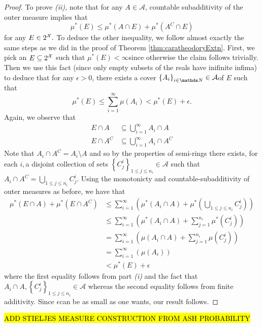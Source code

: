 \begin{proof}
To prove \emph{(ii), }note that for any $A\in\mathcal{A}$, countable
subadditivity of the outer measure implies that 
\[
\mu^{*}\left(E\right)\leq\mu^{*}\left(A\cap E\right)+\mu^{*}\left(A^{C}\cap E\right)
\]
for any $E\in2^{\mathcal{X}}.$ To deduce the other inequality, we follow almost
exactly the same steps as we did in the proof of Theorem \ref{thm:caratheodoryExtn}.
First, we pick an $E\subseteq2^{\mathcal{X}}$ such that $\mu^{*}\left(E\right)<\infty$since
otherwise the claim follows trivially. Then we use this fact (since
only empty subsets of the reals have inifinite infima) to deduce that
for any $\epsilon>0$, there exists a cover $\left\{ A_{i}\right\} _{i\in\N}\in\mathcal{A}$of
$E$ such that
\[
\mu^{*}\left(E\right)\leq\sum_{i=1}^{\infty}\mu\left(A_{i}\right)<\mu^{*}\left(E\right)+\epsilon.
\]
Again, we observe that 
\begin{align*}
E\cap A & \subseteq\bigcup_{i=1}^{\infty}A_{i}\cap A\\
E\cap A^{C} & \subseteq\bigcup_{i=1}^{\infty}A_{i}\cap A^{C}
\end{align*}
Note that $A_{i}\cap A^{C}=A_{i}\setminus A$ and so by the properties
of semi-rings there exists, for each $i,$a disjoint collection of
sets $\left\{ C_{j}^{i}\right\} _{1\leq j\leq n_{i}}\in\mathcal{A}$
such that $A_{i}\cap A^{C}=\bigcup_{1\leq j\leq n_{i}}C_{j}^{i}.$
Using the monotonicty and countable-subadditivity of outer measures
as before, we have that
\begin{align*}
\mu^{*}\left(E\cap A\right)+\mu^{*}\left(E\cap A^{C}\right) & \leq\sum_{i=1}^{\infty}\left(\mu^{*}\left(A_{i}\cap A\right)+\mu^{*}\left(\bigcup_{1\leq j\leq n_{i}}C_{j}^{i}\right)\right)\\
 & \leq\sum_{i=1}^{\infty}\left(\mu^{*}\left(A_{i}\cap A\right)+\sum_{j=1}^{n_{i}}\mu^{*}\left(C_{j}^{i}\right)\right)\\
 & =\sum_{i=1}^{\infty}\left(\mu\left(A_{i}\cap A\right)+\sum_{j=1}^{n_{i}}\mu\left(C_{j}^{i}\right)\right)\\
 & =\sum_{i=1}^{\infty}\left(\mu\left(A_{i}\right)\right)\\
 & <\mu^{*}\left(E\right)+\epsilon
\end{align*}
where the first equality follows from part \emph{(i) }and the fact
that $A_{i}\cap A,\left\{ C_{j}^{i}\right\} _{1\leq j\leq n_{i}}\in\mathcal{A}$
whereas the second equality follows from finite additivity. Since
$\epsilon$can be as small as one wants, our result follows.
\end{proof}
\hl{ADD STIELJES MEASURE CONSTRUCTION FROM ASH PROBABILITY}
